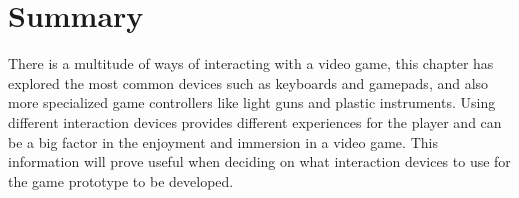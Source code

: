 \section{Summary}
There is a multitude of ways of interacting with a video game, this chapter has explored the most common devices such as keyboards and gamepads, and also more specialized game controllers like light guns and plastic instruments. Using different interaction devices provides different experiences for the player and can be a big factor in the enjoyment and immersion in a video game. This information will prove useful when deciding on what interaction devices to use for the game prototype to be developed.
